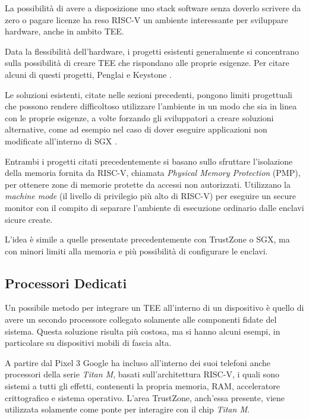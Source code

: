 \documentclass[12pt,italian]{report}
\begin{document}
	La possibilità di avere a disposizione uno stack software senza doverlo scrivere da zero o pagare licenze ha reso RISC-V un ambiente interessante per sviluppare hardware, anche in ambito TEE.
	
	\bigbreak
	
	Data la flessibilità dell'hardware, i progetti esistenti generalmente si concentrano sulla possibilità di creare TEE che rispondano alle proprie esigenze. Per citare alcuni di questi progetti, Penglai \cite{penglai} e Keystone \cite{keystone}. 
	
	Le soluzioni esistenti, citate nelle sezioni precedenti, pongono limiti progettuali che possono rendere difficoltoso utilizzare l'ambiente in un modo che sia in linea con le proprie esigenze, a volte forzando gli sviluppatori a creare soluzioni alternative, come ad esempio nel caso di dover eseguire applicazioni non modificate all'interno di SGX \cite{grapheneSGX}.
	
	Entrambi i progetti citati precedentemente si basano sullo sfruttare l'isolazione della memoria fornita da RISC-V, chiamata \textit{Physical Memory Protection} (PMP), per ottenere zone di memorie protette da accessi non autorizzati. Utilizzano la \textit{machine mode} (il livello di privilegio più alto di RISC-V) per eseguire un secure monitor con il compito di separare l'ambiente di esecuzione ordinario dalle enclavi sicure create.
	
	L'idea è simile a quelle presentate precedentemente con TrustZone o SGX, ma con minori limiti alla memoria e più possibilità di configurare le enclavi.
	
	\subsection{Processori Dedicati}
	\label{subsec:altri-rpc}
	Un possibile metodo per integrare un TEE all'interno di un dispositivo è quello di avere un secondo processore collegato solamente alle componenti fidate del sistema. Questa soluzione risulta più costosa, ma si hanno alcuni esempi, in particolare su dispositivi mobili di fascia alta.
	
	\bigbreak
	
	A partire dal Pixel 3 Google ha incluso all'interno dei suoi telefoni anche processori della serie \textit{Titan M}, basati sull'architettura RISC-V, i quali sono sistemi a tutti gli effetti, contenenti la propria memoria, RAM, acceleratore crittografico e sistema operativo. L'area TrustZone, anch'essa presente, viene utilizzata solamente come ponte per interagire con il chip \textit{Titan M}.
	
\end{document}
